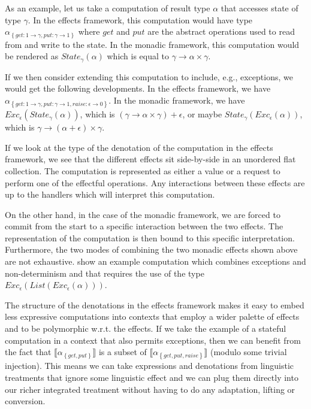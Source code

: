 \documentclass[a4paper,11pt]{easychair}
\newcommand{\sem}[1]{\llbracket #1 \rrbracket}
\begin{document}
As an example, let us take a computation of result type $\alpha$ that accesses
state of type $\gamma$. In the effects framework, this computation would have
type $\alpha_{\left\{get : 1 \to \gamma, put : \gamma \to 1\right\}}$ where
$get$ and $put$ are the abstract operations used to read from and write to the
state. In the monadic framework, this computation would be rendered as
$State_\gamma(\alpha)$ which is equal to $\gamma \to \alpha \times \gamma$.

If we then consider extending this computation to include, e.g., exceptions,
we would get the following developments. In the effects framework, we have
$\alpha_{\left\{get : 1 \to \gamma, put : \gamma \to 1, raise : \epsilon \to
  0\right\}}$. In the monadic framework, we have
$Exc_\epsilon(State_\gamma(\alpha))$, which is $(\gamma \to \alpha \times
\gamma) + \epsilon$, or maybe $State_\gamma(Exc_\epsilon(\alpha))$, which is
$\gamma \to (\alpha + \epsilon) \times \gamma$.

If we look at the type of the denotation of the computation in the effects
framework, we see that the different effects sit side-by-side in an unordered
flat collection. The computation is represented as either a value or a request
to perform one of the effectful operations. Any interactions between these
effects are up to the handlers which will interpret this computation.

On the other hand, in the case of the monadic framework, we are forced to
commit from the start to a specific interaction between the two effects. The
representation of the computation is then bound to this specific
interpretation. Furthermore, the two modes of combining the two monadic
effects shown above are not exhaustive. \citet{kiselyov2013extensible} show an
example computation which combines exceptions and non-determinism and that
requires the use of the type $Exc_\epsilon(List(Exc_\epsilon(\alpha)))$.

The structure of the denotations in the effects framework makes it easy to
embed less expressive computations into contexts that employ a wider palette
of effects and to be polymorphic w.r.t. the effects. If we take the example of
a stateful computation in a context that also permits exceptions, then we can
benefit from the fact that $\sem{\alpha_{\left\{get, put\right\}}}$ is a
subset of $\sem{\alpha_{\left\{get, put, raise\right\}}}$ (modulo some trivial
injection). This means we can take expressions and denotations from linguistic
treatments that ignore some linguistic effect and we can plug them directly
into our richer integrated treatment without having to do any adaptation,
lifting or conversion.
\end{document}
